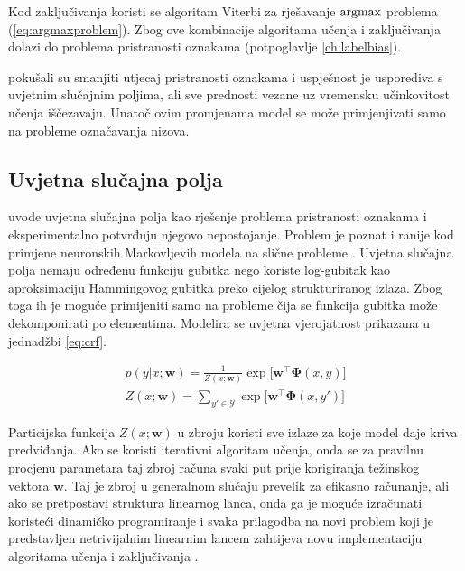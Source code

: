 Kod zaključivanja koristi se algoritam Viterbi za rješavanje $\operatorname*{argmax}$ problema
(\ref{eq:argmaxproblem}). Zbog ove kombinacije algoritama učenja i zaključivanja
dolazi do problema pristranosti oznakama (potpoglavlje \ref{ch:labelbias}).

\cite{cohen05ijcai} pokušali su smanjiti utjecaj pristranosti oznakama i
uspješnost je usporediva s uvjetnim slučajnim poljima, ali sve prednosti vezane
uz vremensku učinkovitost učenja iščezavaju. Unatoč ovim promjenama model se
može primjenjivati samo na probleme označavanja nizova.


\subsection{Uvjetna slučajna polja}

\citet*{lafferty2001conditional} uvode uvjetna slučajna polja kao rješenje
problema pristranosti oznakama i eksperimentalno potvrđuju njegovo nepostojanje.
Problem je poznat i ranije kod primjene neuronskih Markovljevih modela na slične
probleme \citep{leon1991approche}. Uvjetna slučajna polja nemaju određenu
funkciju gubitka nego koriste log-gubitak kao aproksimaciju Hammingovog gubitka
preko cijelog strukturiranog izlaza. Zbog toga ih je moguće primijeniti samo na
probleme čija se funkcija gubitka može dekomponirati po elementima. Modelira se
uvjetna vjerojatnost prikazana u jednadžbi \ref{eq:crf}.

\begin{equation}\label{eq:crf}
\begin{aligned}
  p(y | x; \mathbf{w}) = \frac{1}{Z(x; \mathbf{w})} \exp \big[ \mathbf{w}^\top \mathbf{\Phi}(x, y)\big] \\
  Z(x; \mathbf{w}) = \sum_{y' \in \mathcal{Y}} \exp \big[ \mathbf{w}^\top \mathbf{\Phi}(x, y')\big]
\end{aligned}
\end{equation}

\noindent
Particijska funkcija $Z(x; \mathbf{w})$ u zbroju koristi sve izlaze za koje
model daje kriva predviđanja. Ako se koristi iterativni algoritam učenja, onda
se za pravilnu procjenu parametara taj zbroj računa svaki put prije korigiranja
težinskog vektora $\mathbf{w}$. Taj je zbroj u generalnom slučaju prevelik za
efikasno računanje, ali ako se pretpostavi struktura linearnog lanca, onda ga je
moguće izračunati koristeći dinamičko programiranje i svaka prilagodba na novi
problem koji je predstavljen netrivijalnim linearnim lancem zahtijeva novu
implementaciju algoritama učenja i zaključivanja \citep{lafferty2001conditional,
sha2003shallow}.

